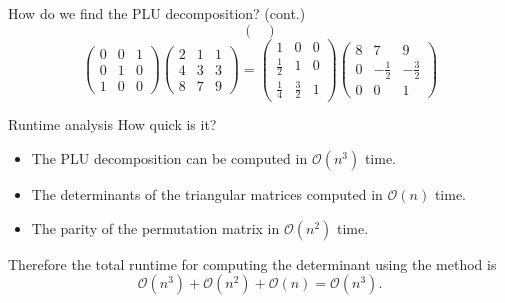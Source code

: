 \documentclass{beamer}
\begin{document}
\begin{frame}{How do we find the PLU decomposition? (cont.)}
\[\begin{pmatrix}{}
            \end{pmatrix}
            \]
            \[
  \begin{pmatrix}{}
                0 & 0 & 1 \\
                0 & 1 & 0 \\
                1 & 0 & 0
            \end{pmatrix}\begin{pmatrix}{}
                2 & 1 & 1 \\
                4 & 3 & 3 \\
                8 & 7 & 9
            \end{pmatrix}
            =\begin{pmatrix}{}
                1 & 0 & 0 \\
                \frac{1}{2} & 1 & 0 \\
                \frac{1}{4} & \frac{3}{2} & 1
            \end{pmatrix}
            \begin{pmatrix}{}
                8 & 7 & 9 \\
                0 & -\frac{1}{2} & -\frac{3}{2} \\
                0 & 0 & 1
                
            \end{pmatrix}
            \]

\end{frame}


\begin{frame}{Runtime analysis}
    How quick is it?
    \begin{itemize}
        \item The PLU decomposition can be computed in $\mathcal{O}(n^3)$ time.
        \item The determinants of the triangular matrices computed in $\mathcal{O}(n)$ time.
        \item The parity of the permutation matrix in $\mathcal{O}(n^2)$ time.
    \end{itemize}

    Therefore the total runtime for computing the determinant using the method is
    \[
        \mathcal{O}(n^3) + \mathcal{O}(n^2) + \mathcal{O}(n) = \mathcal{O}(n^3).
    \]

\end{frame}
\end{document}
